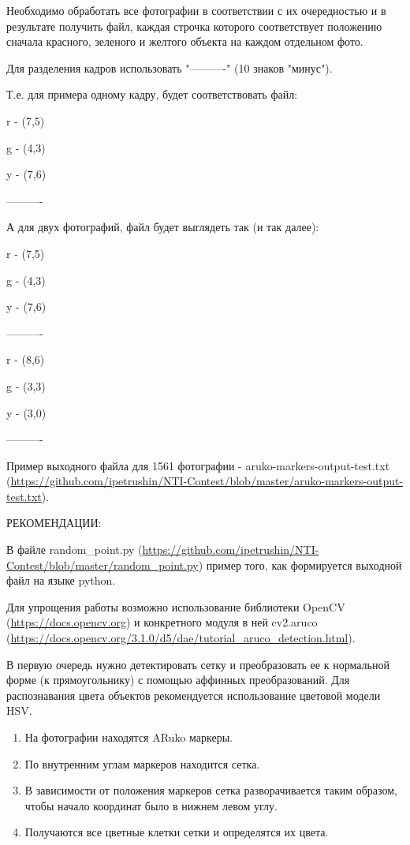 
Необходимо обработать все фотографии в соответствии с их очередностью и в результате получить файл, каждая строчка которого соответствует положению сначала красного, зеленого и желтого объекта на каждом отдельном фото. 

Для разделения кадров использовать "----------" (10 знаков "минус").

Т.е. для примера одному кадру, будет соответствовать файл: 

r - (7,5)

g - (4,3)

y - (7,6)

----------

А для двух фотографий, файл будет выглядеть так (и так далее):

r - (7,5)

g - (4,3)

y - (7,6)

----------

r - (8,6)

g - (3,3)

y - (3,0)

----------

Пример выходного файла для 1561 фотографии -  aruko-markers-output-test.txt (\url{https://github.com/ipetrushin/NTI-Contest/blob/master/aruko-markers-output-test.txt}).

РЕКОМЕНДАЦИИ: 

В файле random\_point.py (\url{https://github.com/ipetrushin/NTI-Contest/blob/master/random_point.py}) пример того, 
как формируется выходной файл на языке python.

Для упрощения работы возможно использование библиотеки OpenCV (\url{https://docs.opencv.org}) и конкретного 
модуля в ней cv2.aruco (\url{https://docs.opencv.org/3.1.0/d5/dae/tutorial_aruco_detection.html}).

В первую очередь нужно детектировать сетку и преобразовать ее к нормальной форме (к прямоугольнику) с 
помощью аффинных преобразований. Для распознавания цвета объектов рекомендуется использование цветовой модели HSV.

\solutionSection

\begin{enumerate}
    \item На фотографии находятся ARuko маркеры.
    \item По внутренним углам маркеров находится сетка.
    \item В зависимости от положения маркеров сетка разворачивается таким образом, чтобы начало координат было в нижнем левом углу.
    \item Получаются все цветные клетки сетки и определятся их цвета.
\end{enumerate}

